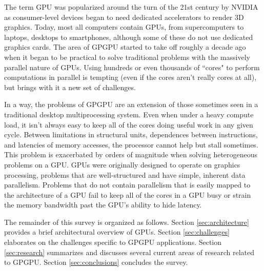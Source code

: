 \documentclass[prodmode,acmtecs]{acmsmall} %
\begin{document}
The term GPU was popularized around the turn of the 21st century by NVIDIA as
consumer-level devices began to need dedicated accelerators to render 3D
graphics. Today, most all computers contain GPUs, from supercomputers to
laptops, desktops to smartphones, although some of these do not use dedicated
graphics cards. The area of GPGPU started to take off roughly a decade ago when
it began to be practical to solve traditional problems with the massively
parallel nature of GPUs. Using hundreds or even thousands of ``cores" to perform
computations in parallel is tempting (even if the cores aren't really cores at
all), but brings with it a new set of challenges.

In a way, the problems of GPGPU are an extension of those sometimes seen in a
traditional desktop multiprocessing system. Even when under a heavy compute
load, it isn't always easy to keep all of the cores doing useful work in any
given cycle. Between limitations in structural units, dependences between
instructions, and latencies of memory accesses, the processor cannot help but
stall sometimes. This problem is exacerbated by orders of magnitude when solving
heterogeneous problems on a GPU. GPUs were originally designed to operate on
graphics processing, problems that are well-structured and have simple, inherent
data parallelism. Problems that do not contain parallelism that is easily mapped
to the architecture of a GPU fail to keep all of the cores in a GPU busy or
strain the memory bandwidth past the GPU's ability to hide latency.

The remainder of this survey is organized as follows. Section
\ref{sec:architecture} provides a brief architectural overview of GPUs. Section
\ref{sec:challenges} elaborates on the challenges specific to GPGPU
applications. Section \ref{sec:research} summarizes and discusses several
current areas of research related to GPGPU. Section \ref{sec:conclusions}
concludes the survey.

\end{document}
